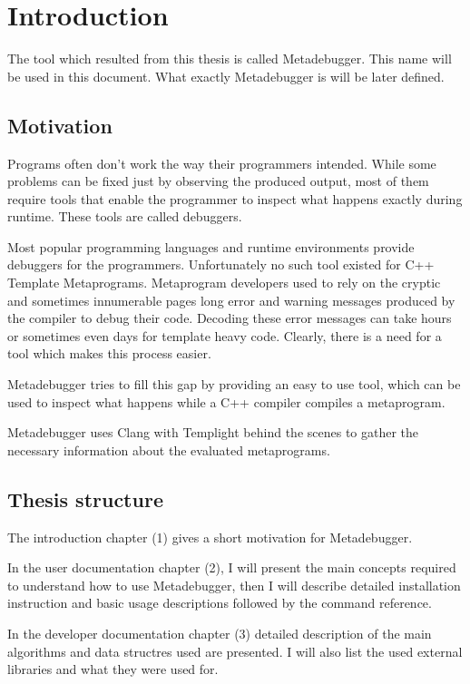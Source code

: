 
\chapter{Introduction}

The tool which resulted from this thesis is called Metadebugger. This name will
be used in this document. What exactly Metadebugger is will be later defined.

\section{Motivation}

Programs often don't work the way their programmers intended. While some
problems can be fixed just by observing the produced output, most of them
require tools that enable the programmer to inspect what happens exactly
during runtime. These tools are called debuggers.

Most popular programming languages and runtime environments provide debuggers
for the programmers. Unfortunately no such tool existed for C++\cite{cpp14}
Template Metaprograms. Metaprogram developers used to rely on the cryptic and
sometimes innumerable pages long error and warning messages produced by the
compiler to debug their code. Decoding these error messages can take hours or
sometimes even days for template heavy code.
\cite{sinkovics-phd}\cite{boost-spirit}
Clearly, there is a need for a tool which makes this process easier.

Metadebugger tries to fill this gap by providing an easy to use tool, which can
be used to inspect what happens while a C++ compiler compiles a metaprogram.

Metadebugger uses Clang with Templight behind the scenes to gather the
necessary information about the evaluated metaprograms.

\section{Thesis structure}

The introduction chapter (1) gives a short motivation for Metadebugger.

In the user documentation chapter (2), I will present the main concepts
required to understand how to use Metadebugger, then I will describe detailed
installation instruction and basic usage descriptions followed by the command
reference.

In the developer documentation chapter (3) detailed description of the main
algorithms and data structres used are presented. I will also list the used
external libraries and what they were used for.

